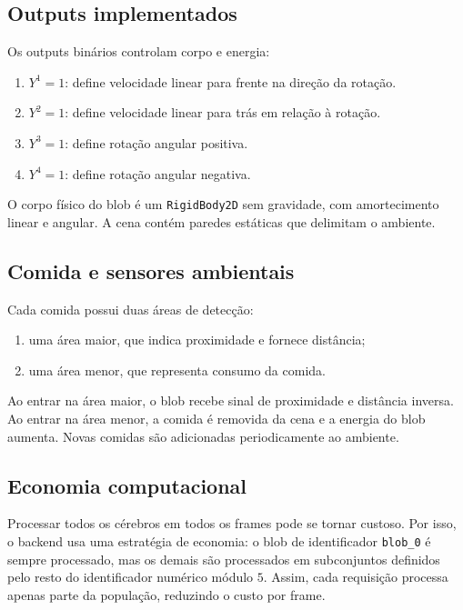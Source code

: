 \documentclass[12pt,a4paper,fleqn]{article}
\begin{document}
\subsection{Outputs implementados}

Os outputs binários controlam corpo e energia:

\begin{enumerate}
	\item $Y^1=1$: define velocidade linear para frente na direção da rotação.
	\item $Y^2=1$: define velocidade linear para trás em relação à rotação.
	\item $Y^3=1$: define rotação angular positiva.
	\item $Y^4=1$: define rotação angular negativa.
\end{enumerate}

O corpo físico do blob é um \texttt{RigidBody2D} sem gravidade, com amortecimento linear e angular. A cena contém paredes estáticas que delimitam o ambiente.

\subsection{Comida e sensores ambientais}

Cada comida possui duas áreas de detecção:

\begin{enumerate}
	\item uma área maior, que indica proximidade e fornece distância;
	\item uma área menor, que representa consumo da comida.
\end{enumerate}

Ao entrar na área maior, o blob recebe sinal de proximidade e distância inversa. Ao entrar na área menor, a comida é removida da cena e a energia do blob aumenta. Novas comidas são adicionadas periodicamente ao ambiente.

\subsection{Economia computacional}

Processar todos os cérebros em todos os frames pode se tornar custoso. Por isso, o backend usa uma estratégia de economia: o blob de identificador \texttt{blob\_0} é sempre processado, mas os demais são processados em subconjuntos definidos pelo resto do identificador numérico módulo $5$. Assim, cada requisição processa apenas parte da população, reduzindo o custo por frame.
\end{document}

